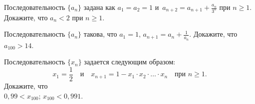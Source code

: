 \begin{problems}

\item
Последовательность $\{ a_{n} \}$ задана как
$a_1 = a_2 = 1$ и~$a_{n+2} = a_{n+1} + \frac{a_{n}}{3^n}$ при $n \geq 1$.
Докажите, что $a_n < 2$ при $n \geq 1$.

\item
Последовательность $\{ a_{n} \}$ такова, что
$a_1 = 1$, $a_{n+1} = a_n + \frac{1}{a_{n}}$.
Докажите, что $a_{100} > 14$.

\item
Последовательность $\{ x_n \}$ задается следующим образом:
\[
    x_1 = \frac{1}{2}
\quad\text{и}\quad
    x_{n+1}
=
    1 - x_{1} \cdot x_{2} \cdot \ldots \cdot x_{n}
\quad\text{при $n \geq 1$.}
\]
Докажите, что
\\
\subproblem $0{,}99 < x_{100}$;
\qquad
\subproblem $x_{100} < 0{,}991$.

\end{problems}

